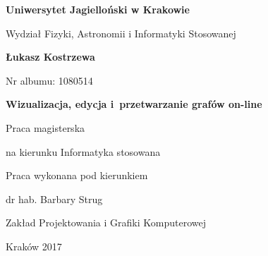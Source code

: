 \begin{titlepage}
\centering
\textbf{\Large Uniwersytet Jagielloński w Krakowie}\par
\vspace{0.2cm}
{\Large Wydział Fizyki, Astronomii i Informatyki Stosowanej}\par
\vfill
\textbf{\Large Łukasz Kostrzewa}\par
\vspace{0.2cm}
{\small Nr albumu: 1080514\par}
\vspace{1.5cm}
\textbf{\huge Wizualizacja, edycja i~przetwarzanie grafów on-line}\par
\vspace{1cm}
Praca magisterska\par
na kierunku Informatyka stosowana\par
\vfill
\begin{flushright}
Praca wykonana pod kierunkiem \par
dr hab. Barbary Strug\par
Zakład Projektowania i Grafiki Komputerowej\par
\end{flushright}
\vspace{1cm}
Kraków 2017\par
\end{titlepage}